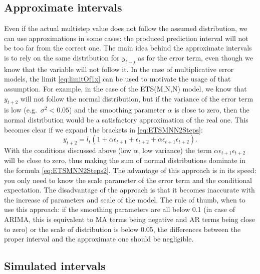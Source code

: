 \documentclass[
]{book}
\theoremstyle{definition}
\theoremstyle{definition}
\theoremstyle{definition}
\theoremstyle{definition}
\theoremstyle{remark}
\begin{document}
\hypertarget{approximate-intervals}{%
\subsection{Approximate intervals}\label{approximate-intervals}}

Even if the actual multistep value does not follow the assumed distribution, we can use approximations in some cases: the produced prediction interval will not be too far from the correct one. The main idea behind the approximate intervals is to rely on the same distribution for \(y_{t+j}\) as for the error term, even though we know that the variable will not follow it. In the case of multiplicative error models, the limit \eqref{eq:limitOf1x} can be used to motivate the usage of that assumption. For example, in the case of the ETS(M,N,N) model, we know that \(y_{t+2}\) will not follow the normal distribution, but if the variance of the error term is low (e.g.~\(\sigma^2 < 0.05\)) and the smoothing parameter \(\alpha\) is close to zero, then the normal distribution would be a satisfactory approximation of the real one. This becomes clear if we expand the brackets in \eqref{eq:ETSMNN2Steps}:
\begin{equation}
    y_{t+2} = l_{t} (1 + \alpha \epsilon_{t+1} + \epsilon_{t+2} + \alpha \epsilon_{t+1} \epsilon_{t+2}) .
    \label{eq:ETSMNN2Steps2}
\end{equation}
With the conditions discussed above (low \(\alpha\), low variance) the term \(\alpha \epsilon_{t+1} \epsilon_{t+2}\) will be close to zero, thus making the sum of normal distributions dominate in the formula \eqref{eq:ETSMNN2Steps2}. The advantage of this approach is in its speed: you only need to know the scale parameter of the error term and the conditional expectation. The disadvantage of the approach is that it becomes inaccurate with the increase of parameters and scale of the model. The rule of thumb, when to use this approach: if the smoothing parameters are all below 0.1 (in case of ARIMA, this is equivalent to MA terms being negative and AR terms being close to zero) or the scale of distribution is below 0.05, the differences between the proper interval and the approximate one should be negligible.

\hypertarget{ADAMForecastingPISimulations}{%
\subsection{Simulated intervals}\label{ADAMForecastingPISimulations}}
\end{document}
